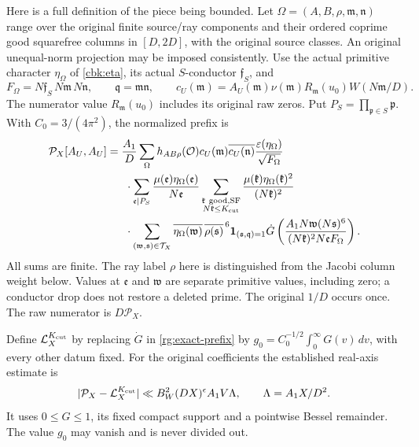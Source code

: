 Here is a full definition of the piece being bounded.
Let \(\Omega=(A,B,\rho,\mathfrak m,\mathfrak n)\) range over the
original finite source/ray components and their ordered coprime good
squarefree columns in \([D,2D]\), with the original source classes.
An original unequal-norm projection may be imposed consistently.
Use the actual primitive character \(\eta_\Omega\) of
\eqref{cbk:eta}, its actual \(S\)-conductor \(\mathfrak f_S\), and
\[
 F_\Omega=N\mathfrak f_S\,N\mathfrak m\,N\mathfrak n,\qquad
 \mathfrak q=\mathfrak m\mathfrak n,\qquad
 c_U(\mathfrak m)=A_U(\mathfrak m)\nu(\mathfrak m)
              R_{\mathfrak m}(u_0)W(N\mathfrak m/D).
\]
The numerator value \(R_{\mathfrak m}(u_0)\) includes its original
raw zeros. Put \(P_S=\prod_{\mathfrak p\in S}\mathfrak p\).
With \(C_0=3/(4\pi^2)\), the normalized prefix is
\begin{equation}\label{rg:exact-prefix}
 \begin{split}
 \mathcal P_X[A_U,A_U]
 ={}&\frac{A_1}{D}\sum_\Omega
 h_{AB\rho}(\mathcal O)c_U(\mathfrak m)\overline{c_U(\mathfrak n)}
          \frac{\varepsilon(\eta_\Omega)}{\sqrt{F_\Omega}}\\
 &\ \cdot\sum_{\mathfrak e\mid P_S}
          \frac{\mu(\mathfrak e)\eta_\Omega(\mathfrak e)}{N\mathfrak e}
 \sum_{\substack{\mathfrak k\ {\rm good,SF}\\
                      N\mathfrak k\le K_{\rm cut}}}
          \frac{\mu(\mathfrak k)\eta_\Omega(\mathfrak k)^2}
                          {(N\mathfrak k)^2}\\
 &\ \cdot\sum_{(\mathfrak w,\mathfrak s)\in\mathcal T_X}
 \overline{\eta_\Omega(\mathfrak w)}\,\overline{\rho(\mathfrak s)}^{\,6}
       \mathbf1_{(\mathfrak s,\mathfrak q)=1}
 \dot G\left(\frac{A_1N\mathfrak w(N\mathfrak s)^6}
                  {(N\mathfrak k)^2N\mathfrak e F_\Omega}\right).
 \end{split}
\end{equation}
All sums are finite. The ray label \(\rho\) here is distinguished
from the Jacobi column weight below. Values at \(\mathfrak e\) and
\(\mathfrak w\) are separate primitive values, including zero; a
conductor drop does not restore a deleted prime.
The original \(1/D\) occurs once. The raw numerator is \(D\mathcal P_X\).

Define \(\mathcal L_X^{K_{\rm cut}}\) by replacing \(\dot G\) in
\eqref{rg:exact-prefix} by
\(g_0=C_0^{-1/2}\int_0^\infty G(v)\,dv\), with every other datum fixed.
For the original coefficients the established real-axis estimate is
\begin{equation}\label{rg:model-error}
 |\mathcal P_X-\mathcal L_X^{K_{\rm cut}}|
 \ll B_W^2(DX)^\epsilon A_1V\Lambda,
 \qquad \Lambda=A_1X/D^2 .
\end{equation}
It uses \(0\le G\le1\), its fixed compact support and a pointwise
Bessel remainder. The value \(g_0\) may vanish and is never divided out.

